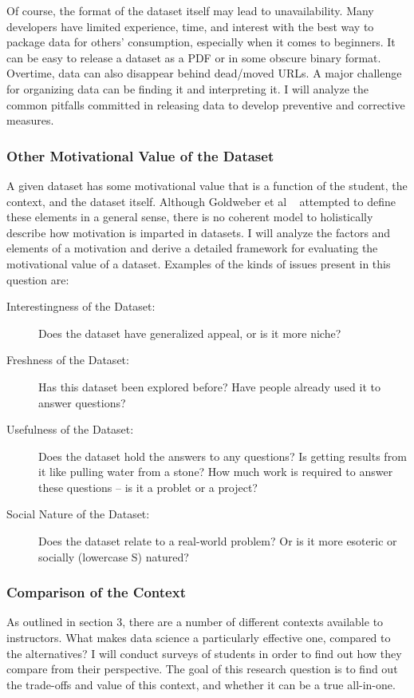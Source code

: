 	Of course, the format of the dataset itself may lead to unavailability. Many developers have limited experience, time, and interest with the best way to package data for others' consumption, especially when it comes to beginners. It can be easy to release a dataset as a PDF or in some obscure binary format. Overtime, data can also disappear behind dead/moved URLs. A major challenge for organizing data can be finding it and interpreting it. I will analyze the common pitfalls committed in releasing data to develop preventive and corrective measures.

\subsubsection{Other Motivational Value of the Dataset}

A given dataset has some motivational value that is a function of the student, the context, and the dataset itself. Although Goldweber et al ~\cite{SocialGoodinComputingEducation} attempted to define these elements in a general sense, there is no coherent model to holistically describe how motivation is imparted in datasets. I will analyze the factors and elements of a motivation and derive a detailed framework for evaluating the motivational value of a dataset. Examples of the kinds of issues present in this question are:\begin{description}
		\item[Interestingness of the Dataset:] Does the dataset have generalized appeal, or is it more niche?
		\item[Freshness of the Dataset:] Has this dataset been explored before? Have people already used it to answer questions?
		\item[Usefulness of the Dataset:] Does the dataset hold the answers to any questions? Is getting results from it like pulling water from a stone? How much work is required to answer these questions -- is it a problet or a project?
		\item[Social Nature of the Dataset:] Does the dataset relate to a real-world problem? Or is it more esoteric or socially (lowercase S) natured?
	\end{description}
	
\subsubsection{Comparison of the Context} As outlined in section 3, there are a number of different contexts available to instructors. What makes data science a particularly effective one, compared to the alternatives? I will conduct surveys of students in order to find out how they compare from their perspective. The goal of this research question is to find out the trade-offs and value of this context, and whether it can be a true all-in-one.

